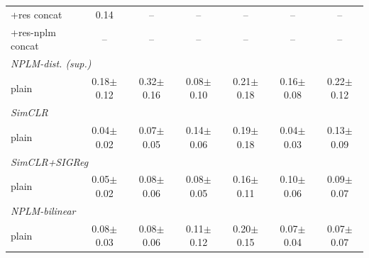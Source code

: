 \begin{center}
\begin{longtable}{lcccccc}
\quad +res concat & 0.14 & -- & -- & -- & -- & -- \\
\quad +res-nplm concat & -- & -- & -- & -- & -- & -- \\
\multicolumn{7}{l}{\emph{NPLM-dist. (sup.)}} \\
\quad plain & 0.18$\pm$0.12 & 0.32$\pm$0.16 & 0.08$\pm$0.10 & 0.21$\pm$0.18 & 0.16$\pm$0.08 & 0.22$\pm$0.12 \\
\multicolumn{7}{l}{\emph{SimCLR}} \\
\quad plain & 0.04$\pm$0.02 & 0.07$\pm$0.05 & 0.14$\pm$0.06 & 0.19$\pm$0.18 & 0.04$\pm$0.03 & 0.13$\pm$0.09 \\
\multicolumn{7}{l}{\emph{SimCLR+SIGReg}} \\
\quad plain & 0.05$\pm$0.02 & 0.08$\pm$0.06 & 0.08$\pm$0.05 & 0.16$\pm$0.11 & 0.10$\pm$0.06 & 0.09$\pm$0.07 \\
\multicolumn{7}{l}{\emph{NPLM-bilinear}} \\
\quad plain & 0.08$\pm$0.03 & 0.08$\pm$0.06 & 0.11$\pm$0.12 & 0.20$\pm$0.15 & 0.07$\pm$0.04 & 0.07$\pm$0.07 \\
\end{longtable}
\end{center}
